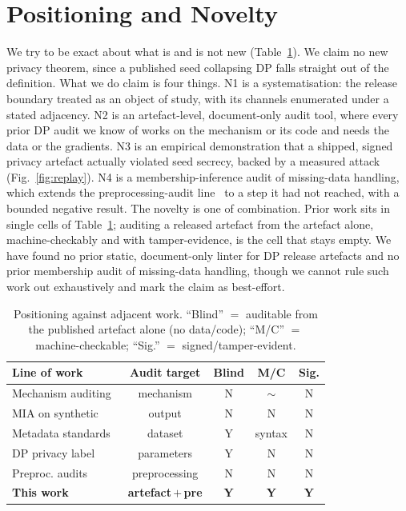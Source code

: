 \documentclass[conference]{IEEEtran}
\begin{document}
\section{Positioning and Novelty}\label{sec:novelty}
We try to be exact about what is and is not new (Table~\ref{tab:novelty}). We claim no new privacy
theorem, since a published seed collapsing DP falls straight out of the definition. What we do claim is
four things. N1 is a systematisation: the release boundary treated as an object of study, with its
channels enumerated under a stated adjacency. N2 is an artefact-level, document-only audit tool, where
every prior DP audit we know of works on the mechanism or its code and needs the data or the gradients.
N3 is an empirical demonstration that a shipped, signed privacy artefact actually violated seed
secrecy, backed by a measured attack (Fig.~\ref{fig:replay}). N4 is a membership-inference audit of
missing-data handling, which extends the preprocessing-audit
line~\cite{ganev_domain,ganev_discrete,ganev_smote} to a step it had not reached, with a bounded
negative result. The novelty is one of combination. Prior work sits in single cells of
Table~\ref{tab:novelty}; auditing a released artefact from the artefact alone, machine-checkably and
with tamper-evidence, is the cell that stays empty. We have found no prior static, document-only linter
for DP release artefacts and no prior membership audit of missing-data handling, though we cannot rule
such work out exhaustively and mark the claim as best-effort.

\begin{table}[t]
\caption{Positioning against adjacent work. ``Blind'' $=$ auditable from the published artefact
alone (no data/code); ``M/C'' $=$ machine-checkable; ``Sig.'' $=$ signed/tamper-evident.}
\label{tab:novelty}
\centering
\setlength{\tabcolsep}{3.5pt}
\begin{tabular}{lcccc}
\toprule
Line of work & Audit target & Blind & M/C & Sig. \\
\midrule
Mechanism auditing~\cite{annamalai2024,cebere2026} & mechanism & N & $\sim$ & N \\
MIA on synthetic~\cite{stadler2022}                & output     & N & N & N \\
Metadata standards~\cite{croissant,gebru2021}      & dataset    & Y & syntax & N \\
DP privacy label~\cite{dibia2026}                  & parameters & Y & N & N \\
Preproc. audits~\cite{ganev_domain,ganev_smote}    & preprocessing & N & N & N \\
\textbf{This work} & \textbf{artefact\,$+$\,pre} & \textbf{Y} & \textbf{Y} & \textbf{Y} \\
\bottomrule
\end{tabular}
\end{table}
\end{document}
